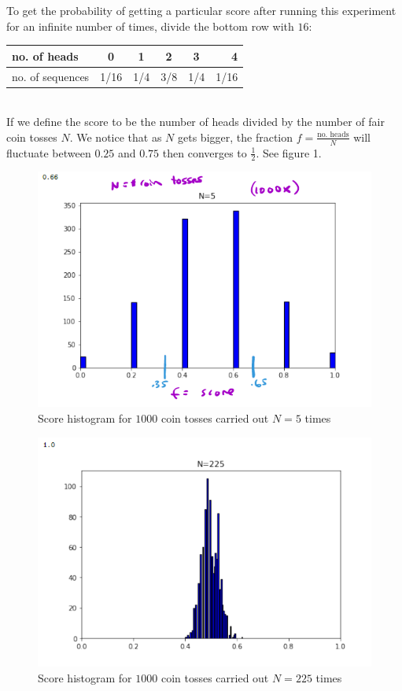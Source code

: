 To get the probability of getting a particular score after running this experiment for an infinite number of times, divide the bottom row with $16$: \\

\begin{tabular}{l*{4}{c}r}
	no. of heads & 0 & 1 & 2 & 3 & 4 \\
	\hline
	no. of sequences & 1/16 & 1/4 & 3/8 & 1/4 & 1/16
\end{tabular} \\

If we define the score to be the number of heads divided by the number of fair coin tosses $N$. We notice that as $N$ gets bigger, the fraction $f=\frac{\text{no. heads}}{N}$ will fluctuate between $0.25$ and $0.75$ then converges to $\frac{1}{2}$. See figure 1.

\begin{figure}[H]
	\centering
	\includegraphics[width=140mm]{2.png}
	\caption{Score histogram for $1000$ coin tosses carried out $N=5$ times}
\end{figure}

\begin{figure}[H]
	\centering
	\includegraphics[width=140mm]{3.png}
	\caption{Score histogram for $1000$ coin tosses carried out $N=225$ times}
\end{figure}

